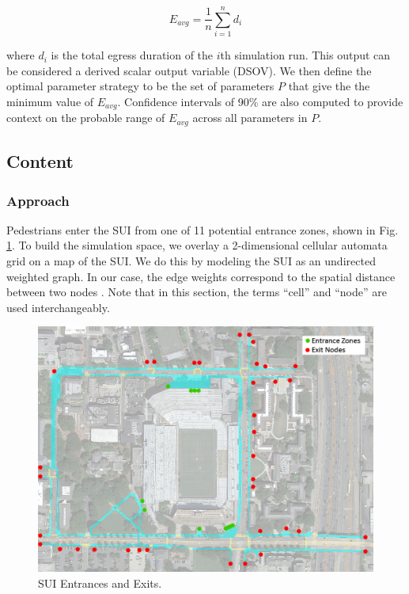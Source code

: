 \documentclass[12pt]{article}
\begin{document}
\begin{equation}
E_{avg} = \frac{1}{n}\sum\limits_{i=1}^n d_i
\end{equation}

where $d_i$ is the total egress duration of the $i$th simulation run. This
output can be considered a derived scalar output variable (DSOV). We then
define the optimal parameter strategy to be the set of parameters $P$ that
give the the minimum value of $E_{avg}$. Confidence intervals of 90\% are also
computed to provide context on the probable range of $E_{avg}$ across all
parameters in $P$.

\subsection{Content}

\subsubsection{Approach}
Pedestrians enter the SUI from one of 11 potential entrance zones, shown in
Fig. \ref{fig:mapentranceexits}. To build the simulation space, we overlay a
2-dimensional cellular automata grid on a map of the SUI. We do this by modeling
the SUI as an undirected weighted graph. In our case, the edge weights correspond
to the spatial distance between two nodes \cite{west2001introduction}. Note
that in this section, the terms ``cell'' and ``node'' are used interchangeably.

\begin{figure}[H]
  \includegraphics[width=\linewidth,natwidth=1026,natheight=750]{GATechMap_20160301_EntranceExits.png}
  \caption{SUI Entrances and Exits.}
  \label{fig:mapentranceexits}
\end{figure}
\end{document}
